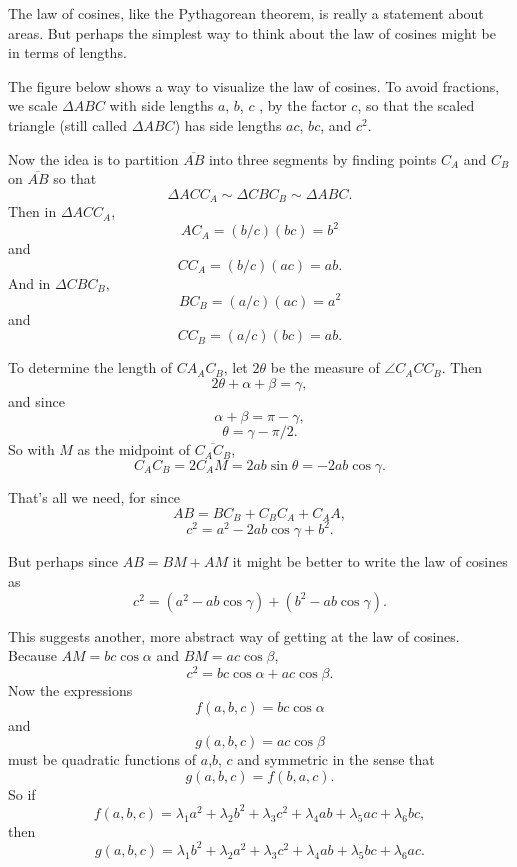 \documentclass{ximera}
\begin{document}
\begin{exploration}
The law of cosines, like the Pythagorean theorem, is really a statement about areas. But perhaps the simplest way to think about the law of cosines might be in terms of lengths. 

The figure below shows a way to visualize the law of cosines. To avoid fractions, we scale $\Delta ABC$ with side lengths $a$, $b$, $c$ , by the factor $c$, so that the scaled triangle (still called $\Delta ABC$) has side lengths $ac$, $bc$, and $c^2$.

 
\begin{onlineOnly}
    \begin{center}
\end{center}
\end{onlineOnly}


Now the idea is to partition $\overline{AB}$ into three segments by finding points $C_A$ and $C_B$ on $\overline{AB}$ so that
\[ 
    \Delta ACC_A \sim \Delta C BC_B \sim \Delta ABC .
\]
Then in $\Delta ACC_A$,
\[
    AC_A = (b/c)(bc) = b^2
\]
and
\[
  CC_A = (b/c)(ac) = ab.
\]
And in $\Delta C BC_B $,
\[
    BC_B = (a/c)(ac) = a^2
\]
and
\[
  CC_B = (a/c)(bc) = ab.
\]

To determine the length of $CA_A C_B$, let $2\theta$ be the measure of $\angle C_A C C_B$. Then
\[
     2\theta + \alpha + \beta = \gamma ,
\]
and since
\[
    \alpha + \beta = \pi - \gamma ,
\]
\[
   \theta = \gamma - \pi/2.
\]
So with $M$ as the midpoint of $\overline{C_A C_B}$,
\[
   C_A C_B = 2 C_A M = 2ab \sin \theta = -2ab\cos\gamma .
\]

That's all we need, for since
\[
    AB = BC_B + C_B C_A + C_AA ,
\]
\[
  c^2 = a^2 - 2ab \cos \gamma + b^2 .
\]

But perhaps since $AB = BM +AM$ it might be better to write the law of cosines as
\[
   c^2 = (a^2 -ab\cos\gamma) + (b^2- ab\cos \gamma) .
\]

This suggests another, more abstract way of getting at the law of cosines. Because $AM = bc \cos \alpha$ and $BM = ac \cos\beta$,
\[
   c^2 = bc \cos \alpha + ac \cos \beta .
\]
Now the expressions 
\[
   f(a,b,c) = bc \cos\alpha
\]
and
\[
   g(a,b,c) = ac \cos \beta
\]
must be quadratic functions of $a$,$b$, $c$ and symmetric in the sense that
\[
  g(a,b,c) = f(b,a,c) .
\]
So if
\[
  f(a,b,c) = \lambda_1 a^2 + \lambda_2 b^2 + \lambda_3 c^2 + \lambda_4 ab + \lambda_5 ac + \lambda_6 bc ,
\]
then
\[
  g(a,b,c) = \lambda_1 b^2 + \lambda_2 a^2 + \lambda_3 c^2 + \lambda_4 ab + \lambda_5 bc + \lambda_6 ac  .
\]

\end{exploration}
\end{document}
